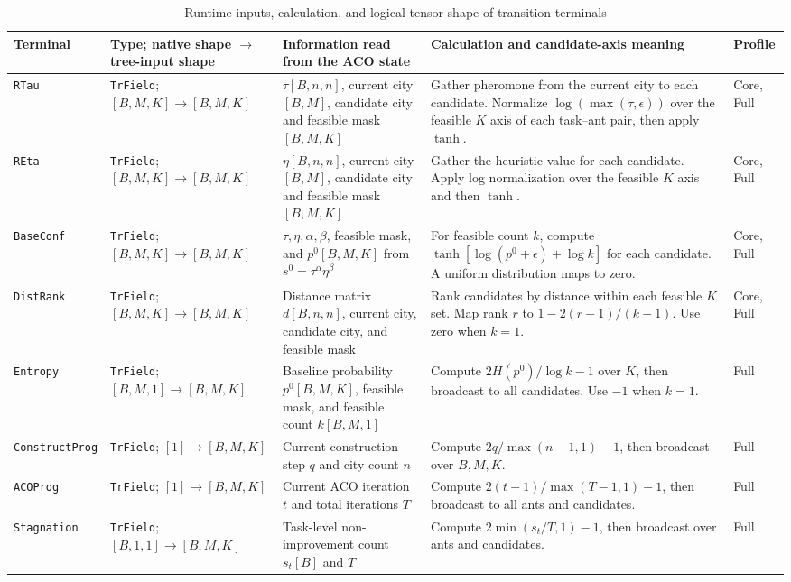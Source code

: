 \documentclass[letterpaper,journal]{IEEEtran}
\begin{document}
\begin{table}[t]
\caption{Runtime inputs, calculation, and logical tensor shape of transition terminals}
\label{tab:transition-terminals}
\centering
\scriptsize
\renewcommand{\arraystretch}{1.18}
\setlength{\tabcolsep}{2.5pt}
\begin{tabular}{L{20mm}L{31mm}L{49mm}L{58mm}L{14mm}}
\toprule
Terminal & Type; native shape \(\to\) tree-input shape &
Information read from the ACO state & Calculation and candidate-axis meaning &
Profile\\
\midrule
\texttt{RTau} &
\texttt{TrField};
\([B,M,K]\to[B,M,K]\) &
\(\tau[B,n,n]\), current city \([B,M]\), candidate city and feasible mask
\([B,M,K]\) &
Gather pheromone from the current city to each candidate.
Normalize \(\log(\max(\tau,\epsilon))\) over the feasible \(K\) axis of each
task--ant pair, then apply \(\tanh\). &
Core, Full\\
\texttt{REta} &
\texttt{TrField};
\([B,M,K]\to[B,M,K]\) &
\(\eta[B,n,n]\), current city \([B,M]\), candidate city and feasible mask
\([B,M,K]\) &
Gather the heuristic value for each candidate.
Apply log normalization over the feasible \(K\) axis and then \(\tanh\). &
Core, Full\\
\texttt{BaseConf} &
\texttt{TrField};
\([B,M,K]\to[B,M,K]\) &
\(\tau,\eta,\alpha,\beta\), feasible mask, and
\(p^0[B,M,K]\) from \(s^0=\tau^\alpha\eta^\beta\) &
For feasible count \(k\), compute
\(\tanh[\log(p^0+\epsilon)+\log k]\) for each candidate.
A uniform distribution maps to zero. &
Core, Full\\
\texttt{DistRank} &
\texttt{TrField};
\([B,M,K]\to[B,M,K]\) &
Distance matrix \(d[B,n,n]\), current city, candidate city, and feasible mask &
Rank candidates by distance within each feasible \(K\) set.
Map rank \(r\) to \(1-2(r-1)/(k-1)\).
Use zero when \(k=1\). &
Core, Full\\
\texttt{Entropy} &
\texttt{TrField};
\([B,M,1]\to[B,M,K]\) &
Baseline probability \(p^0[B,M,K]\), feasible mask, and feasible count
\(k[B,M,1]\) &
Compute \(2H(p^0)/\log k-1\) over \(K\), then broadcast to all candidates.
Use \(-1\) when \(k=1\). &
Full\\
\texttt{ConstructProg} &
\texttt{TrField};
\([1]\to[B,M,K]\) &
Current construction step \(q\) and city count \(n\) &
Compute \(2q/\max(n-1,1)-1\), then broadcast over \(B,M,K\). &
Full\\
\texttt{ACOProg} &
\texttt{TrField};
\([1]\to[B,M,K]\) &
Current ACO iteration \(t\) and total iterations \(T\) &
Compute \(2(t-1)/\max(T-1,1)-1\), then broadcast to all ants and candidates. &
Full\\
\texttt{Stagnation} &
\texttt{TrField};
\([B,1,1]\to[B,M,K]\) &
Task-level non-improvement count \(s_t[B]\) and \(T\) &
Compute \(2\min(s_t/T,1)-1\), then broadcast over ants and candidates. &
Full\\
\bottomrule
\end{tabular}
\end{table}
\end{document}
